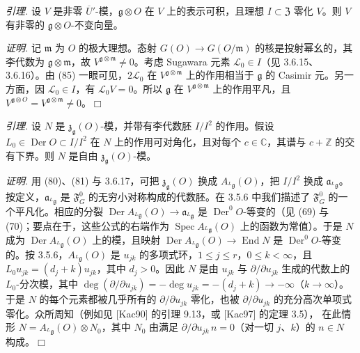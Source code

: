 


 \emph{引理.} 设 $V$ 是非零 $\overline{U}'$-模，$\mathfrak{g}\otimes O$ 在 $V$ 上的表示可积，且理想 $I\subset\mathfrak{Z}$ 零化 $V$。则 $V$ 有非零的 $\mathfrak{g}\otimes O$-不变向量。

\emph{证明.} 记 $\mathfrak{m}$ 为 $O$ 的极大理想。态射 $G(O)\to G(O/\mathfrak{m})$ 的核是投射幂幺的，其李代数为 $\mathfrak{g}\otimes\mathfrak{m}$，故 $V^{\mathfrak{g}\otimes\mathfrak{m}}\neq 0$。考虑 Sugawara 元素 $\mathcal{L}_0\in I$（见 3.6.15、3.6.16）。由 (85) 一眼可见，$2\mathcal{L}_0$ 在 $V^{\mathfrak{g}\otimes\mathfrak{m}}$ 上的作用相当于 $\mathfrak{g}$ 的 Casimir 元。另一方面，因 $\mathcal{L}_0\in I$，有 $\mathcal{L}_0V=0$。所以 $\mathfrak{g}$ 在 $V^{\mathfrak{g}\otimes\mathfrak{m}}$ 上的作用平凡，且 $V^{\mathfrak{g}\otimes O}=V^{\mathfrak{g}\otimes\mathfrak{m}}\neq 0$。\hfill$\Box$

 \emph{引理.} 设 $N$ 是 $\mathfrak{z}_{\mathfrak{g}}(O)$-模，并带有李代数胚 $I/I^2$ 的作用。假设 $L_0\in\operatorname{Der}O\subset I/I^2$ 在 $N$ 上的作用可对角化，且对每个 $c\in\mathbb{C}$，其谱与 $c+\mathbb{Z}$ 的交有下界。则 $N$ 是自由 $\mathfrak{z}_{\mathfrak{g}}(O)$-模。

\emph{证明.} 用 (80)、(81) 与 3.6.17，可把 $\mathfrak{z}_{\mathfrak{g}}(O)$ 换成 $A_{{}^{L}\mathfrak{g}}(O)$，把 $I/I^2$ 换成 $\mathfrak{a}_{{}^{L}\mathfrak{g}}$。按定义，$\mathfrak{a}_{{}^{L}\mathfrak{g}}$ 是 $\mathfrak{F}^0_G$ 的无穷小对称构成的代数胚。在 3.5.6 中我们描述了 $\mathfrak{F}^0_G$ 的一个平凡化。相应的分裂 $\operatorname{Der}A_{{}^{L}\mathfrak{g}}(O)\to\mathfrak{a}_{{}^{L}\mathfrak{g}}$ 是 $\operatorname{Der}^0O$-等变的（见 (69) 与 (70)；要点在于，这些公式的右端作为 $\operatorname{Spec}A_{{}^{L}\mathfrak{g}}(O)$ 上的函数为常值）。于是 $N$ 成为 $\operatorname{Der}A_{{}^{L}\mathfrak{g}}(O)$ 上的模，且映射 $\operatorname{Der}A_{{}^{L}\mathfrak{g}}(O)\to\operatorname{End}N$ 是 $\operatorname{Der}^0O$-等变的。按 3.5.6，$A_{{}^{L}\mathfrak{g}}(O)$ 是 $u_{jk}$ 的多项式环，$1\le j\le r$，$0\le k<\infty$，且 $L_0u_{jk}=(d_j+k)u_{jk}$，其中 $d_j>0$。因此 $N$ 是由 $u_{jk}$ 与 $\partial/\partial u_{jk}$ 生成的代数上的 $L_0$-分次模，其中 $\deg(\partial/\partial u_{jk})=-\deg u_{jk}=-(d_j+k)\to-\infty$（$k\to\infty$）。于是 $N$ 的每个元素都被几乎所有的 $\partial/\partial u_{jk}$ 零化，也被 $\partial/\partial u_{jk}$ 的充分高次单项式零化。众所周知（例如见 [Kac90] 的引理 9.13，或 [Kac97] 的定理 3.5），
在此情形 $N=A_{{}^{L}\mathfrak{g}}(O)\otimes N_0$，其中 $N_0$ 由满足 $\partial/\partial u_{jk}\,n=0$（对一切 $j$、$k$）的 $n\in N$ 构成。\hfill$\Box$

